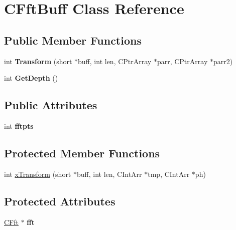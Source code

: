 \hypertarget{class_c_fft_buff}{\section{C\-Fft\-Buff Class Reference}
\label{class_c_fft_buff}
}
\subsection*{Public Member Functions}
\begin{DoxyCompactItemize}
\item 
\hypertarget{class_c_fft_buff_a8e33dacbfa2333b17e756b12f098b399}{int {\bfseries Transform} (short $\ast$buff, int len, C\-Ptr\-Array $\ast$parr, C\-Ptr\-Array $\ast$parr2)}\label{class_c_fft_buff_a8e33dacbfa2333b17e756b12f098b399}

\item 
\hypertarget{class_c_fft_buff_a9238235a90d36a00b442a69060ef3e6f}{int {\bfseries Get\-Depth} ()}\label{class_c_fft_buff_a9238235a90d36a00b442a69060ef3e6f}

\end{DoxyCompactItemize}
\subsection*{Public Attributes}
\begin{DoxyCompactItemize}
\item 
\hypertarget{class_c_fft_buff_a57d169683dc8ac78ca6a19a363656df0}{int {\bfseries fftpts}}\label{class_c_fft_buff_a57d169683dc8ac78ca6a19a363656df0}

\end{DoxyCompactItemize}
\subsection*{Protected Member Functions}
\begin{DoxyCompactItemize}
\item 
int \hyperlink{class_c_fft_buff_a24718d40552caa5d05ca53fd07a673bf}{x\-Transform} (short $\ast$buff, int len, C\-Int\-Arr $\ast$tmp, C\-Int\-Arr $\ast$ph)
\end{DoxyCompactItemize}
\subsection*{Protected Attributes}
\begin{DoxyCompactItemize}
\item 
\hypertarget{class_c_fft_buff_ad67c10117942c34daf083227a6382a24}{\hyperlink{class_c_fft}{C\-Fft} $\ast$ {\bfseries fft}}\label{class_c_fft_buff_ad67c10117942c34daf083227a6382a24}

\end{DoxyCompactItemize}


